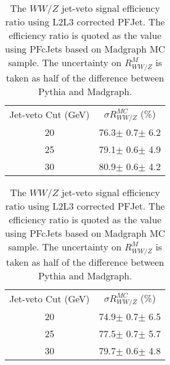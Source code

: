

\begin{table}[htbp]
\caption{ The $WW/Z$ jet-veto signal efficiency ratio using the uncorrected PFJet. 
The efficiency ratio is quoted as the value using PFcJets based on Madgraph MC sample. 
The uncertainty on $R_{WW/Z}^{M}$ is taken as half of the difference 
between Pythia and Madgraph.}
\begin{center}
\label{tab:wwzratio_results}
\begin{tabular}{cc}
\hline
\hline
Jet-veto Cut (GeV) & $\sigma R_{WW/Z}^{MC}$ (\%) \\
    20 &  76.3$\pm$ 0.7$\pm$ 6.2 \\
    25 &  79.1$\pm$ 0.6$\pm$ 4.9 \\
    30 &  80.9$\pm$ 0.6$\pm$ 4.2 \\
\hline
\hline
\end{tabular}
\end{center}
\caption{ The $WW/Z$ jet-veto signal efficiency ratio using L2L3 corrected PFJet. 
The efficiency ratio is quoted as the value using PFcJets based on Madgraph MC sample. 
The uncertainty on $R_{WW/Z}^{M}$ is taken as half of the difference 
between Pythia and Madgraph.}
\begin{center}
\label{tab:wwzratio_jec_results}
\begin{tabular}{cc}
\hline
\hline
Jet-veto Cut (GeV) & $\sigma R_{WW/Z}^{MC}$ (\%) \\
    20 &  74.9$\pm$ 0.7$\pm$ 6.5 \\
    25 &  77.5$\pm$ 0.7$\pm$ 5.7 \\
    30 &  79.7$\pm$ 0.6$\pm$ 4.8 \\
\hline
\hline
\end{tabular}
\end{center}
\end{table}

